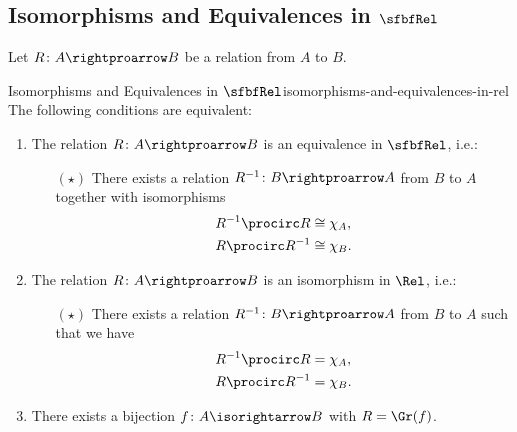 \subsection{Isomorphisms and Equivalences in $\sfbfRel$}\label{subsection-isomorphisms-and-equivalences-in-rel}
Let $R\colon A\rightproarrow B$ be a relation from $A$ to $B$.
\begin{proposition}{Isomorphisms and Equivalences in $\sfbfRel$}{isomorphisms-and-equivalences-in-rel}%
    The following conditions are equivalent:
    \begin{enumerate}
        \item\label{isomorphisms-and-equivalences-in-rel-1}The relation $R\colon A\rightproarrow B$ is an equivalence in $\sfbfRel$, i.e.:
            \begin{itemize}%
                \item[$(\star)$]There exists a relation $R^{-1}\colon B\rightproarrow A$ from $B$ to $A$ together with isomorphisms
                    \begin{align*}
                        R^{-1}\procirc R &\cong \chi_{A},\\
                        R\procirc R^{-1} &\cong \chi_{B}.
                    \end{align*}
            \end{itemize}%
        \item\label{isomorphisms-and-equivalences-in-rel-2}The relation $R\colon A\rightproarrow B$ is an isomorphism in $\Rel$, i.e.:
            \begin{itemize}%
                \item[$(\star)$]There exists a relation $R^{-1}\colon B\rightproarrow A$ from $B$ to $A$ such that we have
                    \begin{align*}
                        R^{-1}\procirc R &= \chi_{A},\\
                        R\procirc R^{-1} &= \chi_{B}.
                    \end{align*}
            \end{itemize}%
        \item\label{isomorphisms-and-equivalences-in-rel-3}There exists a bijection $f\colon A\isorightarrow B$ with $R=\Gr(f)$.
    \end{enumerate}
\end{proposition}
